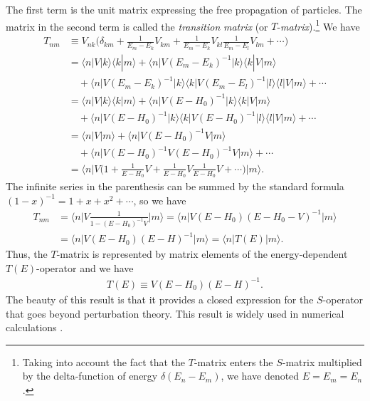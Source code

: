 \documentclass[]{stefan1}
\begin{document}
The first term is the unit matrix expressing the free propagation of
particles. The matrix in the second term is called the \emph{transition}
\emph{matrix} (or $T$-\emph{matrix}).\footnote{Taking into account the fact that
the $ T $-matrix enters the $ S $-matrix multiplied by the
delta-function of energy $ \delta (E_{n} - E_{m}) $, we have denoted
$ E = E_{m} = E_{n} $.} We have
%
\begin{align*}
 T_{nm}
&\equiv V_{nk} \biggl( \delta_{km} + \frac{ 1}{E_{m} -
E_{k}}V_{km}
+ \frac{ 1}{E_{m} - E_{k}}V_{kl} \frac{ 1}{E_{m} - E_{l}} V_{lm} +
\cdots \biggr)
\\
&= \langle n \vert V \vert k \rangle \langle k |m \rangle +
\langle n \vert V(E_{m} - E_{k})^{-1}
\vert k \rangle \langle k |V |m \rangle
\\
&\quad  + \langle n \vert V ( E_{m} - E_{k})^{-1}
\vert k \rangle \langle k \vert V(E_{m} -
E_{l})^{-1} \vert l \rangle \langle l
\vert V \vert m \rangle + \cdots
\\
&= \langle n \vert V \vert k \rangle \langle k |m \rangle +
\langle n \vert V(E - H_{0})^{-1} \vert k
\rangle \langle k \vert V \vert m \rangle
\\
&\quad  + \langle n \vert V ( E - H_{0})^{-1}
\vert k \rangle \langle k \vert V(E - H_{0})^{-1}
\vert l \rangle \langle l \vert V \vert m \rangle +
\cdots
\\
&= \langle n \vert V \vert m \rangle + \langle n \vert
V(E - H_{0})^{-1}V \vert m \rangle
\\
&\quad  + \langle n \vert V ( E - H_{0})^{-1} V(E -
H_{0})^{-1} V \vert m \rangle + \cdots
\\
&= \langle n \vert V \biggl( 1 + \frac{1}{ E - H_{0}}V +
\frac{1}{E
-H_{0}
}V\frac{1}{E -H_{0} }V + \cdots \biggr) \vert m
\rangle .
\end{align*}
The infinite series in the parenthesis can be summed by the standard
formula $(1-x)^{-1} = 1 + x + x^{2} +\cdots $, so we have
%
\begin{align*}
T_{nm} &= \langle n \vert V \frac{1}{1 - (E - H_{0} )^{-1}V}
\vert m \rangle = \langle n \vert V (E - H_{0}) (E
- H_{0} - V)^{-1} \vert m \rangle
\nonumber
\\
&= \langle n \vert V (E - H_{0}) (E - H)^{-1}
\vert m \rangle = \langle n | T(E)|m \rangle .
\nonumber
\end{align*}
Thus, the $ T $-matrix is represented by matrix elements of the
energy-dependent $ T (E) $-\allowbreak operator and we have
\begin{align}
T(E) \equiv V (E - H_{0}) (E - H)^{-1}. \label{eq:SofE}
\end{align}
The beauty of this result is that it provides a closed expression for
the $ S $-operator that goes beyond perturbation theory. This result is
widely used in numerical calculations
\cite{Rescigno,Brown-Jackson,Korchin,Dubovyk}.
\end{document}
